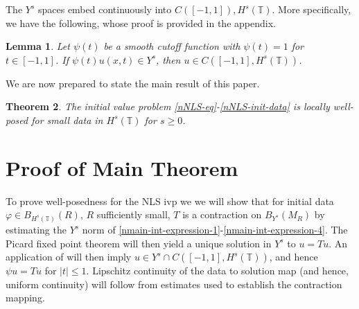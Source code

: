 \documentclass[12pt,reqno]{amsart}
\numberwithin{equation}{section}  %
\newcommand{\ci}{\mathbb{T}}
\newcommand{\vp}{\varphi}
\newtheorem{theorem}{Theorem}[section]
\newtheorem{lemma}[theorem]{Lemma}
\renewcommand{\cref}{\Cref}
\begin{document}
%
The $Y^s$ spaces embed continuously into $C([-1,1]), H^{s}(\ci)$. More
specifically, we have the following, whose proof
is provided in the appendix.
\begin{lemma}
	\label{nlem:cutoff-loc-soln}
	Let $\psi(t)$ be a smooth cutoff function with $\psi(t) =1$ for $t \in [-1,
  1]$. If
  $\psi(t)u(x,t) \in Y^s$, then $u \in C([-1, 1], H^s(\ci))$.
\end{lemma}

We are now prepared to state the main result of this paper.
%
%
%
%
%
%
%
%
%
%
\begin{theorem}
\label{nthm:main}
The initial value problem 
\eqref{nNLS-eq}-\eqref{nNLS-init-data} is locally well-posed for small data in $H^s(\ci)$ for $s \ge
0$.
%
\end{theorem} 
%
%
%
%
%
%
%
%
%
%
%
%
\section{Proof of Main Theorem}
%
%
To prove well-posedness for the NLS ivp we we will 
show that for initial data $\vp \in B_{H^{s}(\ci)}(R)$, $R$ sufficiently small,
$T$ is a contraction on
$B_{Y^{s}}(M_{R})$ by estimating the $Y^s$
norm of \eqref{nmain-int-expression-1}-\eqref{nmain-int-expression-4}. The 
Picard fixed point theorem will
then yield a unique solution in $Y^{s}$ to
$u = Tu$. An application of
\cref{nlem:cutoff-loc-soln} will then imply $u \in Y^{s} \cap C([-1, 1],
H^s(\ci))$, and hence 
$\psi u = Tu$ for $| t | \le 1$.
Lipschitz continuity of the data to solution map (and hence, uniform
continuity) will follow from estimates used to establish the contraction
mapping. 
%
%
%
%
%
%
%
%
%
\end{document}
